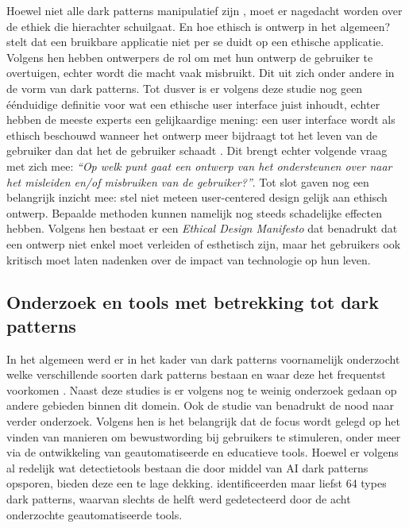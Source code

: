 \vspace{1em}

Hoewel niet alle dark patterns manipulatief zijn \autocite{Kitkowska2023}, moet er  nagedacht worden over de ethiek die hierachter schuilgaat. En hoe ethisch is ontwerp in het algemeen? \textcite{DiGeronimo2020} stelt dat een bruikbare applicatie niet per se duidt op een ethische applicatie. Volgens hen hebben ontwerpers de rol om met hun ontwerp de gebruiker te overtuigen, echter wordt die macht vaak misbruikt. Dit uit zich onder andere in de vorm van dark patterns. Tot dusver is er volgens deze studie nog geen éénduidige definitie voor wat een ethische user interface juist inhoudt, echter hebben de meeste experts een gelijkaardige mening: een user interface wordt als ethisch beschouwd wanneer het ontwerp meer bijdraagt tot het leven van de gebruiker dan dat het de gebruiker schaadt \autocite{DiGeronimo2020}. Dit brengt echter volgende vraag met zich mee: \emph{``Op welk punt gaat een ontwerp van het ondersteunen over naar het misleiden en/of misbruiken van de gebruiker?''}. Tot slot gaven \textcite{Vandenberghe2016} nog een belangrijk inzicht mee: stel niet meteen user-centered design gelijk aan ethisch ontwerp. Bepaalde methoden kunnen namelijk nog steeds schadelijke effecten hebben. Volgens hen bestaat er een \emph{Ethical Design Manifesto} dat benadrukt dat een ontwerp niet enkel moet verleiden of esthetisch zijn, maar het gebruikers ook kritisch moet laten nadenken over de impact van technologie op hun leven.

\vspace{1em}

\subsection{Onderzoek en tools met betrekking tot dark patterns}
\label{subsec:huidig-onderzoek}

\vspace{1em}

In het algemeen werd er in het kader van dark patterns voornamelijk onderzocht welke verschillende soorten dark patterns bestaan en waar deze het frequentst voorkomen \autocite{Luguri2021}. Naast deze studies is er volgens \textcite{Luguri2021} nog te weinig onderzoek gedaan op andere gebieden binnen dit domein. Ook de studie van \textcite{DiGeronimo2020} benadrukt de nood naar verder onderzoek. Volgens hen is het belangrijk dat de focus wordt gelegd op het vinden van manieren om bewustwording bij gebruikers te stimuleren, onder meer via de ontwikkeling van geautomatiseerde en educatieve tools. Hoewel er volgens \textcite{Nie2024} al redelijk wat detectietools bestaan die door middel van AI dark patterns opsporen, bieden deze een te lage dekking.  \textcite{Nie2024} identificeerden maar liefst 64 types dark patterns, waarvan slechts de helft werd gedetecteerd door de acht onderzochte geautomatiseerde tools. 

